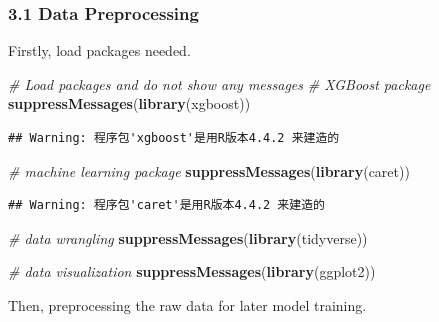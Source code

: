 \documentclass[
]{article}
\newenvironment{Shaded}{\begin{snugshade}}{\end{snugshade}}
\newcommand{\CommentTok}[1]{\textcolor[rgb]{0.56,0.35,0.01}{\textit{#1}}}
\newcommand{\DecValTok}[1]{\textcolor[rgb]{0.00,0.00,0.81}{#1}}
\newcommand{\FunctionTok}[1]{\textcolor[rgb]{0.13,0.29,0.53}{\textbf{#1}}}
\newcommand{\NormalTok}[1]{#1}
\newcommand{\OtherTok}[1]{\textcolor[rgb]{0.56,0.35,0.01}{#1}}
\newcommand{\SpecialCharTok}[1]{\textcolor[rgb]{0.81,0.36,0.00}{\textbf{#1}}}
\begin{document}
\subsubsection{3.1 Data Preprocessing}\label{data-preprocessing}

Firstly, load packages needed.

\begin{Shaded}
\begin{Highlighting}[]
\CommentTok{\# Load packages and do not show any messages}
\CommentTok{\# XGBoost package}
\FunctionTok{suppressMessages}\NormalTok{(}\FunctionTok{library}\NormalTok{(xgboost))}
\end{Highlighting}
\end{Shaded}

\begin{verbatim}
## Warning: 程序包'xgboost'是用R版本4.4.2 来建造的
\end{verbatim}

\begin{Shaded}
\begin{Highlighting}[]
\CommentTok{\# machine learning package}
\FunctionTok{suppressMessages}\NormalTok{(}\FunctionTok{library}\NormalTok{(caret))}
\end{Highlighting}
\end{Shaded}

\begin{verbatim}
## Warning: 程序包'caret'是用R版本4.4.2 来建造的
\end{verbatim}

\begin{Shaded}
\begin{Highlighting}[]
\CommentTok{\# data wrangling}
\FunctionTok{suppressMessages}\NormalTok{(}\FunctionTok{library}\NormalTok{(tidyverse))}

\CommentTok{\# data visualization}
\FunctionTok{suppressMessages}\NormalTok{(}\FunctionTok{library}\NormalTok{(ggplot2))}
\end{Highlighting}
\end{Shaded}

Then, preprocessing the raw data for later model training.

\begin{Shaded}
\end{Shaded}
\end{document}
